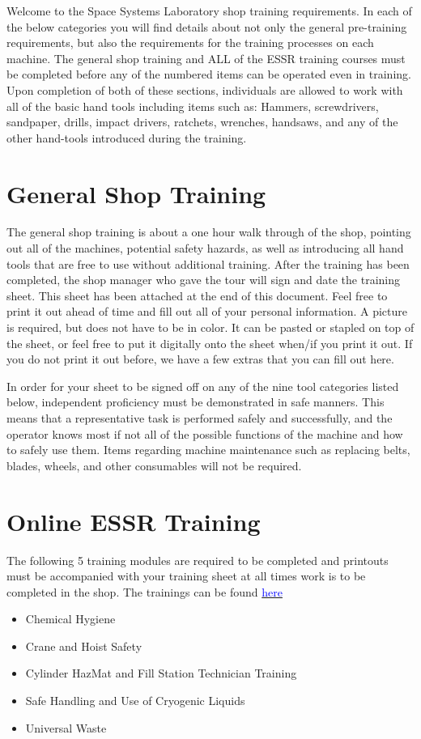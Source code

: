 \documentclass{article}
\begin{document}
Welcome to the Space Systems Laboratory shop training requirements. In each of the below categories you will find details about not only the general pre-training requirements, but also the requirements for the training processes on each machine. The general shop training and ALL of the ESSR training courses must be completed before any of the numbered items can be operated even in training. Upon completion of both of these sections, individuals are allowed to work with all of the basic hand tools including items such as: Hammers, screwdrivers, sandpaper, drills, impact drivers, ratchets, wrenches, handsaws, and any of the other hand-tools introduced during the training.

\section*{General Shop Training}

The general shop training is about a one hour walk through of the shop, pointing out all of the machines, potential safety hazards, as well as introducing all hand tools that are free to use without additional training. After the training has been completed, the shop manager who gave the tour will sign and date the training sheet. This sheet has been attached at the end of this document. Feel free to print it out ahead of time and fill out all of your personal information. A picture is required, but does not have to be in color. It can be pasted or stapled on top of the sheet, or feel free to put it digitally onto the sheet when/if you print it out. If you do not print it out before, we have a few extras that you can fill out here. 

In order for your sheet to be signed off on any of the nine tool categories listed below, independent proficiency must be demonstrated in safe manners. This means that a representative task is performed safely and successfully, and the operator knows most if not all of the possible functions of the machine and how to safely use them. Items regarding machine maintenance such as replacing belts, blades, wheels, and other consumables will not be required. 


\section*{Online ESSR Training}
The following 5 training modules are required to be completed and printouts must be accompanied with your training sheet at all times work is to be completed in the shop. The trainings can be found \href{https://essr.umd.edu/training}{\textcolor{blue}{here}}
\begin{itemize}
    \item Chemical Hygiene
    \item Crane and Hoist Safety
    \item Cylinder HazMat and Fill Station Technician Training
    \item Safe Handling and Use of Cryogenic Liquids
    \item Universal Waste
\end{itemize}
\end{document}
